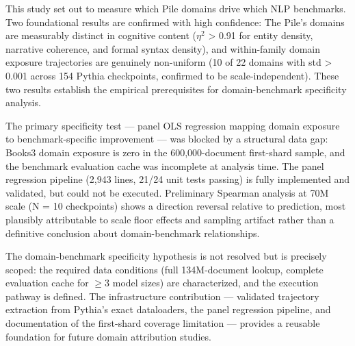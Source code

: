 
This study set out to measure which Pile domains drive which NLP benchmarks. Two foundational results are confirmed with high confidence: The Pile's domains are measurably distinct in cognitive content ($\eta^2$ > 0.91 for entity density, narrative coherence, and formal syntax density), and within-family domain exposure trajectories are genuinely non-uniform (10 of 22 domains with std > 0.001 across 154 Pythia checkpoints, confirmed to be scale-independent). These two results establish the empirical prerequisites for domain-benchmark specificity analysis.

The primary specificity test --- panel OLS regression mapping domain exposure to benchmark-specific improvement --- was blocked by a structural data gap: Books3 domain exposure is zero in the 600,000-document first-shard sample, and the benchmark evaluation cache was incomplete at analysis time. The panel regression pipeline (2,943 lines, 21/24 unit tests passing) is fully implemented and validated, but could not be executed. Preliminary Spearman analysis at 70M scale (N = 10 checkpoints) shows a direction reversal relative to prediction, most plausibly attributable to scale floor effects and sampling artifact rather than a definitive conclusion about domain-benchmark relationships.

The domain-benchmark specificity hypothesis is not resolved but is precisely scoped: the required data conditions (full 134M-document lookup, complete evaluation cache for $\geq 3$ model sizes) are characterized, and the execution pathway is defined. The infrastructure contribution --- validated trajectory extraction from Pythia's exact dataloaders, the panel regression pipeline, and documentation of the first-shard coverage limitation --- provides a reusable foundation for future domain attribution studies.

